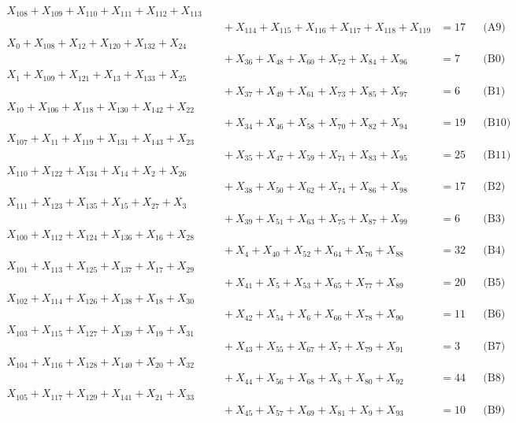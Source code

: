 \documentclass[a4paper,10pt]{article}
\begin{document}
{\begin{align}
X_{108} + X_{109} + X_{110} + X_{111} + X_{112} + X_{113} \\[0.5ex]
&\quad  + X_{114} + X_{115} + X_{116} + X_{117} + X_{118} + X_{119} &= 17 && \text{(A9)} \\
X_{0} + X_{108} + X_{12} + X_{120} + X_{132} + X_{24} \\[0.5ex]
&\quad  + X_{36} + X_{48} + X_{60} + X_{72} + X_{84} + X_{96} &= 7 && \text{(B0)} \\
X_{1} + X_{109} + X_{121} + X_{13} + X_{133} + X_{25} \\[0.5ex]
&\quad  + X_{37} + X_{49} + X_{61} + X_{73} + X_{85} + X_{97} &= 6 && \text{(B1)} \\
X_{10} + X_{106} + X_{118} + X_{130} + X_{142} + X_{22} \\[0.5ex]
&\quad  + X_{34} + X_{46} + X_{58} + X_{70} + X_{82} + X_{94} &= 19 && \text{(B10)} \\
X_{107} + X_{11} + X_{119} + X_{131} + X_{143} + X_{23} \\[0.5ex]
&\quad  + X_{35} + X_{47} + X_{59} + X_{71} + X_{83} + X_{95} &= 25 && \text{(B11)} \\
X_{110} + X_{122} + X_{134} + X_{14} + X_{2} + X_{26} \\[0.5ex]
&\quad  + X_{38} + X_{50} + X_{62} + X_{74} + X_{86} + X_{98} &= 17 && \text{(B2)} \\
X_{111} + X_{123} + X_{135} + X_{15} + X_{27} + X_{3} \\[0.5ex]
&\quad  + X_{39} + X_{51} + X_{63} + X_{75} + X_{87} + X_{99} &= 6 && \text{(B3)} \\
X_{100} + X_{112} + X_{124} + X_{136} + X_{16} + X_{28} \\[0.5ex]
&\quad  + X_{4} + X_{40} + X_{52} + X_{64} + X_{76} + X_{88} &= 32 && \text{(B4)} \\
X_{101} + X_{113} + X_{125} + X_{137} + X_{17} + X_{29} \\[0.5ex]
&\quad  + X_{41} + X_{5} + X_{53} + X_{65} + X_{77} + X_{89} &= 20 && \text{(B5)} \\
\allowbreak
X_{102} + X_{114} + X_{126} + X_{138} + X_{18} + X_{30} \\[0.5ex]
&\quad  + X_{42} + X_{54} + X_{6} + X_{66} + X_{78} + X_{90} &= 11 && \text{(B6)} \\
X_{103} + X_{115} + X_{127} + X_{139} + X_{19} + X_{31} \\[0.5ex]
&\quad  + X_{43} + X_{55} + X_{67} + X_{7} + X_{79} + X_{91} &= 3 && \text{(B7)} \\
X_{104} + X_{116} + X_{128} + X_{140} + X_{20} + X_{32} \\[0.5ex]
&\quad  + X_{44} + X_{56} + X_{68} + X_{8} + X_{80} + X_{92} &= 44 && \text{(B8)} \\
X_{105} + X_{117} + X_{129} + X_{141} + X_{21} + X_{33} \\[0.5ex]
&\quad  + X_{45} + X_{57} + X_{69} + X_{81} + X_{9} + X_{93} &= 10 && \text{(B9)} \\
\end{align}}
\end{document}
